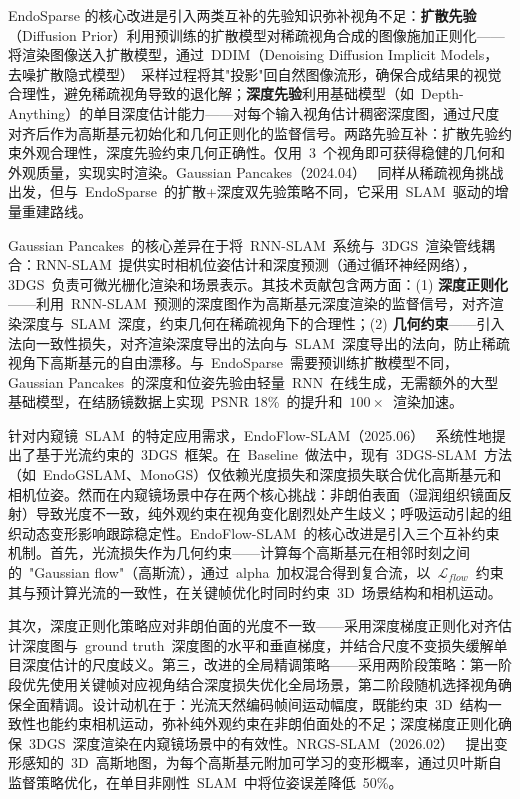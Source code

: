 EndoSparse 的核心改进是引入两类互补的先验知识弥补视角不足：\textbf{扩散先验}（Diffusion Prior）利用预训练的扩散模型对稀疏视角合成的图像施加正则化——将渲染图像送入扩散模型，通过~DDIM（Denoising Diffusion Implicit Models，去噪扩散隐式模型）~采样过程将其"投影"回自然图像流形，确保合成结果的视觉合理性，避免稀疏视角导致的退化解；\textbf{深度先验}利用基础模型（如~Depth-Anything）的单目深度估计能力——对每个输入视角估计稠密深度图，通过尺度对齐后作为高斯基元初始化和几何正则化的监督信号。两路先验互补：扩散先验约束外观合理性，深度先验约束几何正确性。仅用~3~个视角即可获得稳健的几何和外观质量，实现实时渲染。Gaussian Pancakes（2024.04）~\cite{2404_06128} 同样从稀疏视角挑战出发，但与~EndoSparse~的扩散+深度双先验策略不同，它采用~SLAM~驱动的增量重建路线。

Gaussian Pancakes~的核心差异在于将~RNN-SLAM~系统与~3DGS~渲染管线耦合：RNN-SLAM~提供实时相机位姿估计和深度预测（通过循环神经网络），3DGS~负责可微光栅化渲染和场景表示。其技术贡献包含两方面：(1) \textbf{深度正则化}——利用~RNN-SLAM~预测的深度图作为高斯基元深度渲染的监督信号，对齐渲染深度与~SLAM~深度，约束几何在稀疏视角下的合理性；(2) \textbf{几何约束}——引入法向一致性损失，对齐渲染深度导出的法向与~SLAM~深度导出的法向，防止稀疏视角下高斯基元的自由漂移。与~EndoSparse~需要预训练扩散模型不同，Gaussian Pancakes~的深度和位姿先验由轻量~RNN~在线生成，无需额外的大型基础模型，在结肠镜数据上实现~PSNR 18\%~的提升和~$100\times$~渲染加速。

针对内窥镜~SLAM~的特定应用需求，EndoFlow-SLAM（2025.06）~\cite{2506_21420} 系统性地提出了基于光流约束的~3DGS~框架。在~Baseline~做法中，现有~3DGS-SLAM~方法（如~EndoGSLAM、MonoGS）仅依赖光度损失和深度损失联合优化高斯基元和相机位姿。然而在内窥镜场景中存在两个核心挑战：非朗伯表面（湿润组织镜面反射）导致光度不一致，纯外观约束在视角变化剧烈处产生歧义；呼吸运动引起的组织动态变形影响跟踪稳定性。EndoFlow-SLAM~的核心改进是引入三个互补约束机制。首先，光流损失作为几何约束——计算每个高斯基元在相邻时刻之间的~"Gaussian flow"（高斯流），通过~alpha~加权混合得到复合流，以~$\mathcal{L}_{flow}$~约束其与预计算光流的一致性，在关键帧优化时同时约束~3D~场景结构和相机运动。

其次，深度正则化策略应对非朗伯面的光度不一致——采用深度梯度正则化对齐估计深度图与~ground truth~深度图的水平和垂直梯度，并结合尺度不变损失缓解单目深度估计的尺度歧义。第三，改进的全局精调策略——采用两阶段策略：第一阶段优先使用关键帧对应视角结合深度损失优化全局场景，第二阶段随机选择视角确保全面精调。设计动机在于：光流天然编码帧间运动幅度，既能约束~3D~结构一致性也能约束相机运动，弥补纯外观约束在非朗伯面处的不足；深度梯度正则化确保~3DGS~深度渲染在内窥镜场景中的有效性。NRGS-SLAM（2026.02）~\cite{2602_17182} 提出变形感知的~3D~高斯地图，为每个高斯基元附加可学习的变形概率，通过贝叶斯自监督策略优化，在单目非刚性~SLAM~中将位姿误差降低~50\%。

